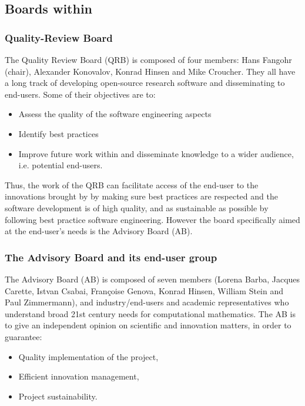 \documentclass{deliverablereport}
\begin{document}
\subsection{Boards within \ODK}

\subsubsection{Quality-Review Board}

The Quality Review Board (QRB) is composed of four members: Hans
Fangohr (chair), Alexander Konovalov, Konrad Hinsen and Mike
Croucher. They all have a long track of developing open-source research
software and disseminating to end-users. Some of their objectives are
to:

\begin{itemize}
\item{Assess the quality of the software engineering aspects}
\item{Identify best practices}
\item{Improve future work within \ODK and disseminate knowledge to a wider audience, i.e. potential end-users.}
\end{itemize}

Thus, the work of the QRB can facilitate access of the end-user to the
innovations brought by \ODK by making sure best practices are
respected and the software development is of high quality, and as
sustainable as possible by following best practice software
engineering.
However the
board specifically aimed at the end-user's needs is the Advisory
Board (AB).

\subsubsection{The Advisory Board and its end-user group}

The Advisory Board (AB) is composed of seven members (Lorena Barba, Jacques Carette,
Istvan Csabai, Françoise Genova, Konrad Hinsen, William Stein and Paul
Zimmermann), and industry/end-users and academic representatives who
understand broad 21st century needs for computational mathematics.
The AB is to give an independent opinion on scientific and innovation
matters, in order to guarantee:

\begin{itemize}
\item Quality implementation of the project,
\item Efficient innovation management,
\item Project sustainability.
\end{itemize}
\end{document}
